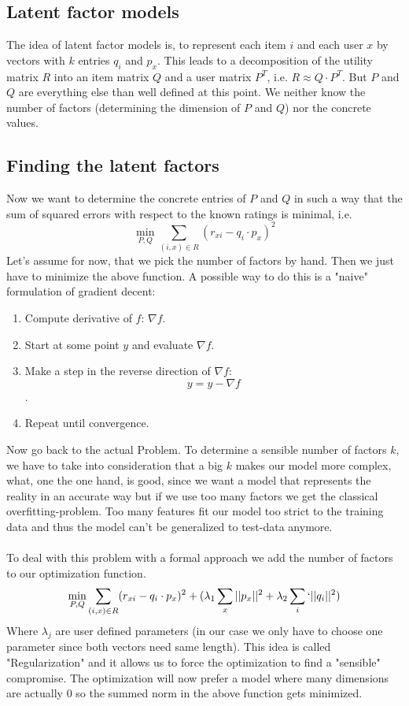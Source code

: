 \documentclass[]{article}
\begin{document}
\subsection{Latent factor models}
The idea of latent factor models is, to represent each item $i$ and each user $x$ by vectors with $k$ entries $q_i$ and $p_x$. This leads to a decomposition of the utility matrix $R$ into an item matrix $Q$ and a user matrix $P^T$, i.e. $R \approx Q \cdot P^T$. But $P$ and $Q$ are everything else than well defined at this point. We neither know the number of factors (determining the dimension of $P$ and $Q$) nor the concrete values.

\subsection{Finding the latent factors}
Now we want to determine the concrete entries of $P$ and $Q$ in such a way that the sum of squared errors with respect to the known ratings is minimal, i.e.
\[
 \min_{P,Q}\sum_{(i,x) \in R} (r_{xi} - q_i \cdot p_x )^2
\]
Let's assume for now, that we pick the number of factors by hand. Then we just have to minimize the above function. A possible way to do this is a "naive" formulation of gradient decent:
\begin{enumerate}
\item Compute derivative of $f$: $\nabla f$.
\item Start at some point $y$ and evaluate $\nabla f$.
\item Make a step in the reverse direction of $\nabla f$: $$y= y - \nabla f$$.
\item Repeat until convergence.
\end{enumerate}
Now go back to the actual Problem. To determine a sensible number of factors $k$, we have to take into consideration that a big $k$ makes our model more complex, what, one the one hand, is good, since we want a model that represents the reality in an accurate way but if we use too many factors we get the classical overfitting-problem. Too many features fit our model too strict to the training data and thus the model can't be generalized to test-data anymore. \\\\

To deal with this problem with a formal approach we add the number of factors to our optimization function.
\[
 \min_{P,Q}\sum_{(i,x) \in R} (r_{xi} -q_i \cdot p_x )^2 + (\lambda_1\sum_x\vert\vert p_x\vert \vert^2 + \lambda_2\sum_i`\vert\vert q_i\vert \vert^2)
\]
Where $\lambda_j$ are user defined parameters (in our case we only have to choose one parameter since both vectors need same length). This idea is called "Regularization" and it allows us to force the optimization to find a "sensible" compromise. The optimization will now prefer a model where many dimensions are actually $0$ so the summed norm in the above function gets minimized.
\end{document}

